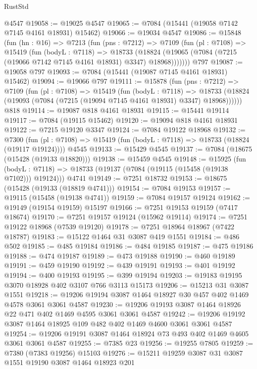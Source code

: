 \begin{lexlean}{RustStd}
\begin{coremodule}
    @4547
@19058 := @19025 @4547
@19065 := @7084 (@15441 (@19058 @7142 @7145 @4161 @18931) @15462)
@19066 := @19034 @4547
@19086 := @15848
    (fun (hn : @16) =>
    @7213
      (fun (pns : @7212) =>
      @7109
        (fun (pl : @7108) =>
        @15419
          (fun (bodyL : @7118) =>
          @18733
            (@18824 (@19065 (@7084 (@7215 (@19066 @7142 @7145 @4161 @18931) @3347) @18968)))))))
    @797
@19087 := @19058 @797
@19093 := @7084 (@15441 (@19087 @7145 @4161 @18931) @15462)
@19094 := @19066 @797
@19111 := @15878
    (fun (pns : @7212) =>
    @7109
      (fun (pl : @7108) =>
      @15419
        (fun (bodyL : @7118) =>
        @18733 (@18824 (@19093 (@7084 (@7215 (@19094 @7145 @4161 @18931) @3347) @18968))))))
    @818
@19114 := @19087 @818 @4161 @18931
@19115 := @15441 @19114
@19117 := @7084 (@19115 @15462)
@19120 := @19094 @818 @4161 @18931
@19122 := @7215 @19120 @3347
@19124 := @7084 @19122 @18968
@19132 := @7300
    (fun (pl : @7108) => @15419 (fun (bodyL : @7118) => @18733 (@18824 (@19117 @19124))))
    @4545
@19133 := @15429 @4545
@19137 := @7084 (@18675 (@15428 (@19133 @18820)))
@19138 := @15459 @4545
@19148 := @15925
    (fun (bodyL : @7118) => @18733 (@19137 (@7084 (@19115 (@15458 (@19138 @7102))) @19124)))
    @4741
@19149 := @7251 @18732
@19153 := @18675 (@15428 (@19133 (@18819 @4741)))
@19154 := @7084 @19153
@19157 := @19115 (@15458 (@19138 @4741))
@19159 := @7084 @19157 @19124
@19162 := @19149 (@19154 @19159) @15197
@19166 := @7251 @19153 @19159 (@7417 @18674)
@19170 := @7251 @19157 @19124 (@15962 @19114)
@19174 := @7251 @19122 @18968 (@7539 @19120)
@19178 := @7251 @18964 @18967 (@7422 @18787)
@19183 := @15122 @1464 @31 @3087 @419 @1551
@19184 := @486 @502
@19185 := @485 @19184
@19186 := @484 @19185
@19187 := @475 @19186
@19188 := @474 @19187
@19189 := @473 @19188
@19190 := @460 @19189
@19191 := @459 @19190
@19192 := @439 @19191
@19193 := @401 @19192
@19194 := @400 @19193
@19195 := @399 @19194
@19203 := @19183 @19195 @3070 @18928 @402 @3107 @766 @3113 @15173
@19206 := @15213 @31 @3087 @1551
@19218 := @19206 @19194 @3087 @1464 @18927 @30 @457 @402 @1469 @4578 @3061 @3061 @4587
@19230 := @19206 @19193 @3087 @1464 @18926 @22 @471 @402 @1469 @4595 @3061 @3061 @4587
@19242 := @19206 @19192 @3087 @1464 @18925 @109 @482 @402 @1469 @4600 @3061 @3061 @4587
@19254 := @19206 @19191 @3087 @1464 @18924 @73 @493 @402 @1469 @4605 @3061 @3061 @4587
@19255 := @7385 @23
@19256 := @19255 @7805
@19259 := @7380 (@7383 @19256) @15103
@19276 := @15211
    @19259
    @3087
    @31
    @3087
    @1551
    @19190
    @3087
    @1464
    @18923
    @201

\end{coremodule}
\end{lexlean}
